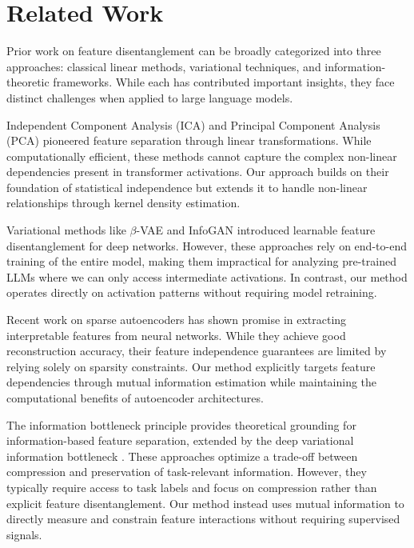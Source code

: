 \documentclass{article} %
\begin{document}
\section{Related Work}
\label{sec:related}

Prior work on feature disentanglement can be broadly categorized into three approaches: classical linear methods, variational techniques, and information-theoretic frameworks. While each has contributed important insights, they face distinct challenges when applied to large language models.

Independent Component Analysis (ICA) \cite{Bell1995AnIA} and Principal Component Analysis (PCA) \cite{F.R.S.1901LIIIOL} pioneered feature separation through linear transformations. While computationally efficient, these methods cannot capture the complex non-linear dependencies present in transformer activations. Our approach builds on their foundation of statistical independence but extends it to handle non-linear relationships through kernel density estimation.

Variational methods like $\beta$-VAE \cite{Higgins2016betaVAELB} and InfoGAN \cite{Chen2016InfoGANIR} introduced learnable feature disentanglement for deep networks. However, these approaches rely on end-to-end training of the entire model, making them impractical for analyzing pre-trained LLMs where we can only access intermediate activations. In contrast, our method operates directly on activation patterns without requiring model retraining.

Recent work on sparse autoencoders \cite{Vincent2010StackedDA} has shown promise in extracting interpretable features from neural networks. While they achieve good reconstruction accuracy, their feature independence guarantees are limited by relying solely on sparsity constraints. Our method explicitly targets feature dependencies through mutual information estimation while maintaining the computational benefits of autoencoder architectures.

The information bottleneck principle \cite{Tishby2015DeepLA} provides theoretical grounding for information-based feature separation, extended by the deep variational information bottleneck \cite{Alemi2017DeepVI}. These approaches optimize a trade-off between compression and preservation of task-relevant information. However, they typically require access to task labels and focus on compression rather than explicit feature disentanglement. Our method instead uses mutual information to directly measure and constrain feature interactions without requiring supervised signals.
\end{document}
